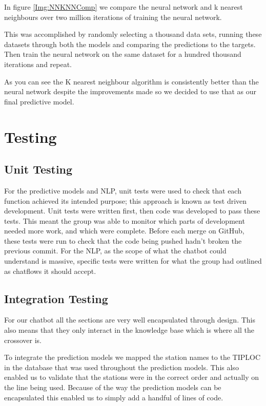 \documentclass[11pt]{article}
\begin{document}
	In figure \ref{Img:NNKNNComp} we compare the neural network and k nearest neighbours over two million iterations of training the neural network.
	
	This was accomplished by randomly selecting a thousand data sets, running these datasets through both the models and comparing the predictions to the targets. Then train the neural network on the same dataset for a hundred thousand iterations and repeat.
	
	As you can see the K nearest neighbour algorithm is consistently better than the neural network despite the improvements made so we decided to use that as our final predictive model.
	
	\section{Testing} \label{Testing}
	
	\subsection{Unit Testing}
	For the predictive models and NLP, unit tests were used to check that each function achieved its intended purpose; this approach is known as test driven development. Unit tests were written first, then code was developed to pass these tests. This meant the group was able to monitor which parts of development needed more work, and which were complete. Before each merge on GitHub, these tests were run to check that the code being pushed hadn’t broken the previous commit. For the NLP, as the scope of what the chatbot could understand is massive, specific tests were written for what the group had outlined as chatflows it should accept. 
	
	
	\subsection{Integration Testing}
	
	For our chatbot all the sections are very well encapsulated through design. This also means that they only interact in the knowledge base which is where all the crossover is. 
	
	To integrate the prediction models we mapped the station names to the TIPLOC in the database that was used throughout the prediction models. This also enabled us to validate that the stations were in the correct order and actually on the line being used. Because of the way the prediction models can be encapsulated this enabled us to simply add a handful of lines of code.
	
\end{document}

